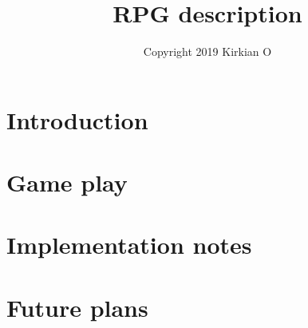 \documentclass[12pt,fleqn]{article}
\title{RPG description}
\author{Copyright 2019 Kirkian O}
\begin{document}
\maketitle

\tableofcontents



\section{Introduction}
\label{sec:intro}


\section{Game play}
\label{sec:play}


\section{Implementation notes}
\label{sec:impl}


\section{Future plans}
\label{sec:future}

\end{document}
